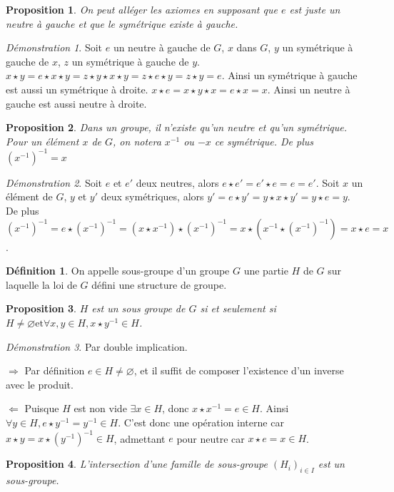 \documentclass[a4paper, 11pt, french]{book}
\newenvironment{itemise}{\itemize}{\enditemize}
\theoremstyle{plain} %
\newtheorem{proposition}{Proposition}
\theoremstyle{definition} %
\newtheorem{definition}{Définition}
\theoremstyle{remark} %
\newtheorem*{demonstration}{Démonstration}
\newcommand{\1}{\mathds{1}}
\newcommand\vide{\varnothing}
\newcommand{\inv}[1]{#1^{-1}}
\newcommand{\et}{\mathrel{\mathrm{et}}}
\newcommand\equivalence[3]{
	\begin{demonstration}
		#1
		\begin{itemise}
			\item[$\Longrightarrow$] #2
			\item[$\Longleftarrow$] #3
		\end{itemise}
	\end{demonstration}
}
\begin{document}
\begin{proposition}
	On peut alléger les axiomes en supposant que $e$ est juste un neutre à gauche et que le symétrique existe à gauche.
\end{proposition}

\begin{demonstration}
	Soit $e$ un neutre à gauche de $G$, $x$ dans $G$, $y$ un symétrique à gauche de $x$, $z$ un symétrique à gauche de $y$.
	$x\star y=e\star x\star y=z\star y\star x\star y=z\star e\star y=z\star y=e$.
	Ainsi un symétrique à gauche est aussi un symétrique à droite.
	$x\star e=x\star y\star x=e\star x=x$.
	Ainsi un neutre à gauche est aussi neutre à droite.
\end{demonstration}

\begin{proposition}
	Dans un groupe, il n'existe qu'un neutre et qu'un symétrique.
	Pour un élément $x$ de $G$, on notera $ x^{-1}$ ou $-x$ ce symétrique.
	De plus $\inv{(x^{-1})}=x$
\end{proposition}

\begin{demonstration}
	Soit $e$ et $e'$ deux neutres, alors $e\star e'=e'\star e=e=e'$.
	Soit $x$ un élément de $G$, $y$ et $y'$ deux symétriques, alors $y'=e\star y'=y\star x\star y'=y\star e=y$.
	De plus $(x^{-1})^{-1}=e\star(x^{-1})^{-1}=(x\star x^{-1})\star(x^{-1})^{-1}=x\star(x^{-1}\star(x^{-1})^{-1})=x\star e=x$.
\end{demonstration}

\begin{definition}
	On appelle sous-groupe d'un groupe $G$ une partie $H$ de $G$ sur laquelle la loi de $G$ défini une structure de groupe.
\end{definition}

\begin{proposition}
	$H$ est un sous groupe de $G$ si et seulement si $H\neq\vide\et\forall x, y\in H, x\star\inv{y}\in H$.
\end{proposition}

\equivalence{Par double implication.}
{
	Par définition $e\in H\neq\vide$, et il suffit de composer l'existence d'un inverse avec le produit.
}{
	Puisque $H$ est non vide $\exists x\in H$, donc $x\star x^{-1}=e\in H$.
	Ainsi $\forall y\in H, e\star\inv{y}=\inv{y}\in H$.
	C'est donc une opération interne car $x\star y=x\star\inv{(\inv{y})}\in H$, admettant $e$ pour neutre car $x\star e=x\in H$.
}

\begin{proposition}
	L'intersection d'une famille de sous-groupe $(H_i)_{i\in I}$ est un sous-groupe.
\end{proposition}
\end{document}
